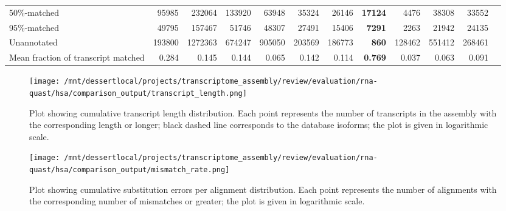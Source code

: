 \documentclass[12pt,a4paper]{article}
\begin{document}
\begin{table}[t]
\begin{adjustbox}{width=1\textwidth}
\begin{tabular}{|l*{11}{|r}|}
50\%-matched                                            & 95985                  & 232064                 & 133920                 & 63948                  & 35324                  & 26146                  & \textbf{17124}         & 4476                   & 38308                  & 33552                  \\
95\%-matched                                            & 49795                  & 157467                 & 51746                  & 48307                  & 27491                  & 15406                  & \textbf{7291}          & 2263                   & 21942                  & 24135                  \\
Unannotated                                             & 193800                 & 1272363                & 674247                 & 905050                 & 203569                 & 186773                 & \textbf{860}           & 128462                 & 551412                 & 268461                 \\
Mean fraction of transcript matched                     & 0.284                  & 0.145                  & 0.144                  & 0.065                  & 0.142                  & 0.114                  & \textbf{0.769}         & 0.037                  & 0.063                  & 0.091                  \\ \hline
\end{tabular}
\end{adjustbox}
\end{table}

\FloatBarrier
\clearpage
{}

\begin{figure}[t]
\centering
\texttt{[image: /mnt/dessertlocal/projects/transcriptome\_assembly/review/evaluation/rna-quast/hsa/comparison\_output/transcript\_length.png]}
\caption{Plot showing cumulative transcript length distribution. Each point represents the number of transcripts in the assembly with the corresponding length or longer; black dashed line corresponds to the database isoforms; the plot is given in logarithmic scale.}
\end{figure}
\FloatBarrier
\clearpage


\begin{figure}[t]
\centering
\texttt{[image: /mnt/dessertlocal/projects/transcriptome\_assembly/review/evaluation/rna-quast/hsa/comparison\_output/mismatch\_rate.png]}
\caption{Plot showing cumulative substitution errors per alignment distribution. Each point represents the number of alignments with the corresponding number of mismatches or greater; the plot is given in logarithmic scale.}
\end{figure}
\FloatBarrier
\clearpage
\end{document}
